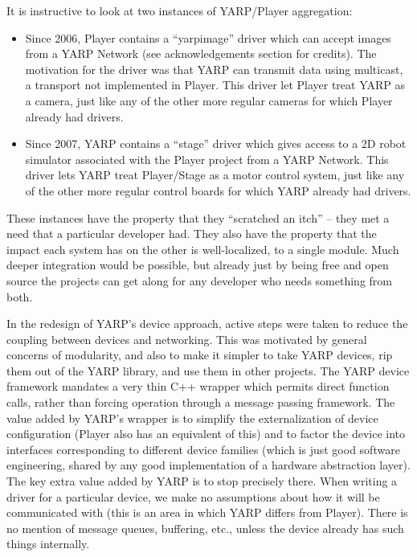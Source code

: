 It is instructive to look at two instances of YARP/Player aggregation:

\begin{itemize}

\item
Since 2006, Player contains a ``yarpimage'' driver which can accept
images from a YARP Network (see acknowledgements section for credits).
The motivation for the driver was that YARP can transmit
data using multicast, a transport not implemented in Player. 
This driver let Player treat YARP as a camera, just like
any of the other more regular cameras for which
Player already had drivers.

\item
Since 2007, YARP contains a ``stage'' driver which gives access to 
a 2D robot simulator associated with the Player project 
from a YARP Network.  This driver lets YARP treat Player/Stage as
a motor control system, just like any of the other more regular 
control boards for which YARP already had drivers.

\end{itemize}

These instances have the property that they ``scratched an itch'' --
they met a need that a particular developer had.
They also have the property that the impact each system
has on the other is well-localized, to a single module.
Much deeper integration would be possible, but already
just by being free and open source the projects can get along
for any developer who needs something from both.

In the redesign of YARP's device approach, active steps were
taken to reduce the coupling between devices and networking.
%
This was motivated by general concerns of modularity, and also
to make it simpler to take YARP devices, rip them out
of the YARP library, and use them in other projects.
%
%
%
The YARP device framework mandates a very thin C++ wrapper 
which permits direct function
calls, rather than forcing operation through a message passing
framework.  The value added by YARP's wrapper is to simplify the
externalization of device configuration (Player also has an equivalent of
this) and to factor the device into interfaces corresponding to
different device families (which is just good software engineering,
shared by any good implementation of a hardware abstraction layer).
%
The key extra value added by YARP is to stop precisely there.
%
When writing a driver for a particular device, we make no assumptions
about how it will be communicated with (this is an area in which YARP
differs from Player).  There is no mention of message queues, 
buffering, etc., unless the device already has such things internally.


